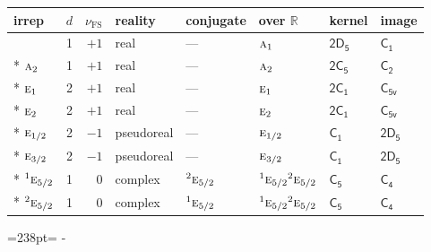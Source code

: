 \documentclass[10pt,a4paper]{article}
\makeatletter
\def\grouprule#1#2{\noalign{\marks\LTgroupmarks{\the\belowrulesep}\nobreak\vskip#1%
  \vskip\aboverulesep}\multispan\LT@cols\unskip{\leaders\hrule\@height#2\hfill\kern\z@}\cr
  \noalign{\penalty\LTrulebreak\vskip\belowrulesep\global\@lastruleclass\z@}}
\newcommand{\needspace}[1]{\par\penalty-100\begingroup\dimen0=#1\relax\dimen2=\pagegoal
  \advance\dimen2-\pagetotal\ifdim\dimen0>\dimen2\relax\ifdim\dimen2>0pt\vfil\break\fi\fi
  \endgroup}
\numberwithin{equation}{section}
\newcommand{\grp}[1]{\mathsf{#1}}
\newcommand{\irr}[1]{\text{\normalfont\scshape #1}}
\newcommand{\conjpair}[1]{{}^{#1}}
\newcommand{\detbox}[1]{{\setlength{\fboxsep}{1pt}\fbox{#1}}}
\newcommand{\fsind}{\nu_{\mathrm{FS}}}
\makeatother
\begin{document}
{\small\renewcommand{\arraystretch}{1.25}\setlength{\tabcolsep}{4pt}\begin{longtable}{@{}lrrlllll@{}}\toprule
irrep & $d$ & $\fsind$ & reality & conjugate & over $\mathbb{R}$ & kernel & image\\\midrule\endhead
\bottomrule\endfoot\endlastfoot
\detbox{$\irr{a}_{1}$} & 1 & $+1$ & real & --- & $\irr{a}_{1}$ & \href{2D5.pdf}{$\grp{2D_{5}}$} & \href{../../../rotation/data/pdf/C1.pdf}{$\grp{C_{1}}$}\\*
$\irr{a}_{2}$ & 1 & $+1$ & real & --- & $\irr{a}_{2}$ & \href{2C5.pdf}{$\grp{2C_{5}}$} & \href{../../../rotation/data/pdf/C2.pdf}{$\grp{C_{2}}$}\\*
$\irr{e}_{1}$ & 2 & $+1$ & real & --- & $\irr{e}_{1}$ & \href{2C1.pdf}{$\grp{2C_{1}}$} & \href{../../../rotation/data/pdf/C5v.pdf}{$\grp{C_{5v}}$}\\*
$\irr{e}_{2}$ & 2 & $+1$ & real & --- & $\irr{e}_{2}$ & \href{2C1.pdf}{$\grp{2C_{1}}$} & \href{../../../rotation/data/pdf/C5v.pdf}{$\grp{C_{5v}}$}\\*
\grouprule{0pt}{\lightrulewidth}
$\irr{e}_{1/2}$ & 2 & $-1$ & pseudoreal & --- & $\irr{e}_{1/2}$ & \href{C1.pdf}{$\grp{C_{1}}$} & \href{2D5.pdf}{$\grp{2D_{5}}$}\\*
$\irr{e}_{3/2}$ & 2 & $-1$ & pseudoreal & --- & $\irr{e}_{3/2}$ & \href{C1.pdf}{$\grp{C_{1}}$} & \href{2D5.pdf}{$\grp{2D_{5}}$}\\*
$\conjpair{1}\irr{e}_{5/2}$ & 1 & $0$ & complex & $\conjpair{2}\irr{e}_{5/2}$ & $\conjpair{1}\irr{e}_{5/2}\conjpair{2}\irr{e}_{5/2}$ & \href{C5.pdf}{$\grp{C_{5}}$} & \href{../../../rotation/data/pdf/C4.pdf}{$\grp{C_{4}}$}\\*
$\conjpair{2}\irr{e}_{5/2}$ & 1 & $0$ & complex & $\conjpair{1}\irr{e}_{5/2}$ & $\conjpair{1}\irr{e}_{5/2}\conjpair{2}\irr{e}_{5/2}$ & \href{C5.pdf}{$\grp{C_{5}}$} & \href{../../../rotation/data/pdf/C4.pdf}{$\grp{C_{4}}$}\\
\bottomrule\end{longtable}}
\needspace{238pt}
\end{document}
